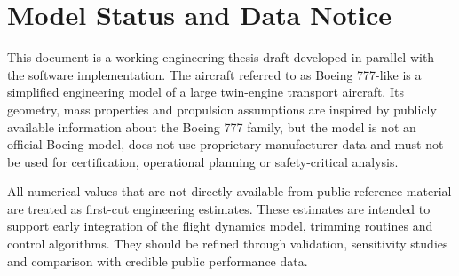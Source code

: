 \chapter*{Model Status and Data Notice}

This document is a working engineering-thesis draft developed in parallel with the software implementation. The aircraft referred to as Boeing 777-like is a simplified engineering model of a large twin-engine transport aircraft. Its geometry, mass properties and propulsion assumptions are inspired by publicly available information about the Boeing 777 family, but the model is not an official Boeing model, does not use proprietary manufacturer data and must not be used for certification, operational planning or safety-critical analysis.

All numerical values that are not directly available from public reference material are treated as first-cut engineering estimates. These estimates are intended to support early integration of the flight dynamics model, trimming routines and control algorithms. They should be refined through validation, sensitivity studies and comparison with credible public performance data.
